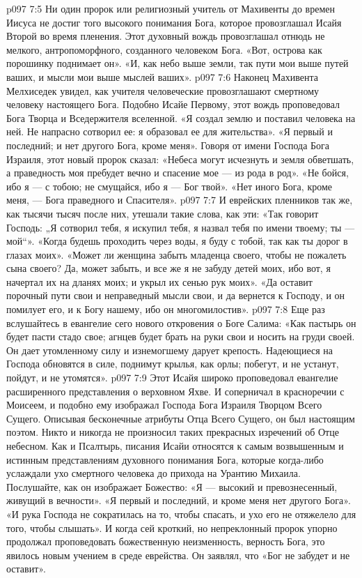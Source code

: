 \vs p097 7:5 \pc Ни один пророк или религиозный учитель от Махивенты до времен Иисуса не достиг того высокого понимания Бога, которое провозглашал Исайя Второй во время пленения. Этот духовный вождь провозглашал отнюдь не мелкого, антропоморфного, созданного человеком Бога. «Вот, острова как порошинку поднимает он». «И, как небо выше земли, так пути мои выше путей ваших, и мысли мои выше мыслей ваших».
\vs p097 7:6 Наконец Махивента Мелхиседек увидел, как учителя человеческие провозглашают смертному человеку настоящего Бога. Подобно Исайе Первому, этот вождь проповедовал Бога Творца и Вседержителя вселенной. «Я создал землю и поставил человека на ней. Не напрасно сотворил ее: я образовал ее для жительства». «Я первый и последний; и нет другого Бога, кроме меня». Говоря от имени Господа Бога Израиля, этот новый пророк сказал: «Небеса могут исчезнуть и земля обветшать, а праведность моя пребудет вечно и спасение мое --- из рода в род». «Не бойся, ибо я --- с тобою; не смущайся, ибо я --- Бог твой». «Нет иного Бога, кроме меня, --- Бога праведного и Спасителя».
\vs p097 7:7 И еврейских пленников так же, как тысячи тысяч после них, утешали такие слова, как эти: «Так говорит Господь: „Я сотворил тебя, я искупил тебя, я назвал тебя по имени твоему; ты --- мой“». «Когда будешь проходить через воды, я буду с тобой, так как ты дорог в глазах моих». «Может ли женщина забыть младенца своего, чтобы не пожалеть сына своего? Да, может забыть, и все же я не забуду детей моих, ибо вот, я начертал их на дланях моих; и укрыл их сенью рук моих». «Да оставит порочный пути свои и неправедный мысли свои, и да вернется к Господу, и он помилует его, и к Богу нашему, ибо он многомилостив».
\vs p097 7:8 Еще раз вслушайтесь в евангелие сего нового откровения о Боге Салима: «Как пастырь он будет пасти стадо свое; агнцев будет брать на руки свои и носить на груди своей. Он дает утомленному силу и изнемогшему дарует крепость. Надеющиеся на Господа обновятся в силе, поднимут крылья, как орлы; побегут, и не устанут, пойдут, и не утомятся».
\vs p097 7:9 Этот Исайя широко проповедовал евангелие расширенного представления о верховном Яхве. И соперничал в красноречии с Моисеем, и подобно ему изображал Господа Бога Израиля Творцом Всего Сущего. Описывая бесконечные атрибуты Отца Всего Сущего, он был настоящим поэтом. Никто и никогда не произносил таких прекрасных изречений об Отце небесном. Как и Псалтырь, писания Исайи относятся к самым возвышенным и истинным представлениям духовного понимания Бога, которые когда\hyp{}либо услаждали ухо смертного человека до прихода на Урантию Михаила. Послушайте, как он изображает Божество: «Я --- высокий и превознесенный, живущий в вечности». «Я первый и последний, и кроме меня нет другого Бога». «И рука Господа не сократилась на то, чтобы спасать, и ухо его не отяжелело для того, чтобы слышать». И когда сей кроткий, но непреклонный пророк упорно продолжал проповедовать божественную неизменность, верность Бога, это явилось новым учением в среде еврейства. Он заявлял, что «Бог не забудет и не оставит».
